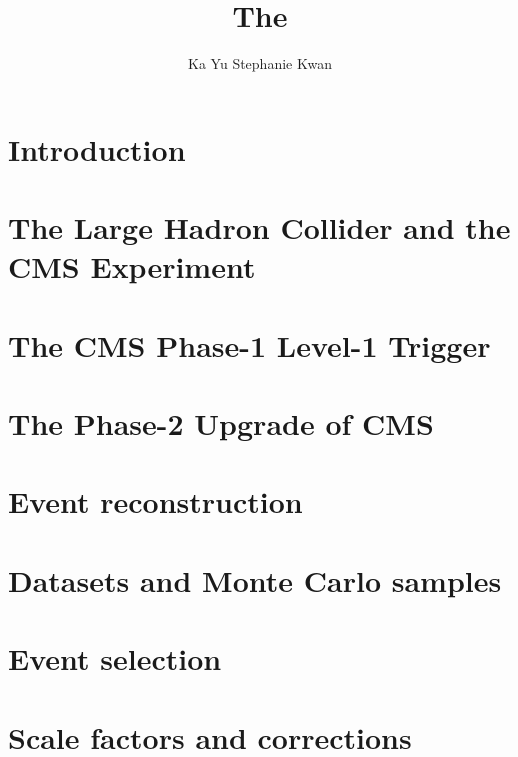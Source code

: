 \documentclass[12pt,lot,lof]{puthesis}
\title{The}
\author{Ka Yu Stephanie Kwan}
\begin{document}
\chapter{Introduction}


\chapter{The Large Hadron Collider and the CMS Experiment}


\chapter{The CMS Phase-1 Level-1 Trigger}


\chapter{The Phase-2 Upgrade of CMS}


\chapter{Event reconstruction}


\chapter{Datasets and Monte Carlo samples}


\chapter{Event selection}


\chapter{Scale factors and corrections}


% 
% 


 \label{bib}
\end{document}
